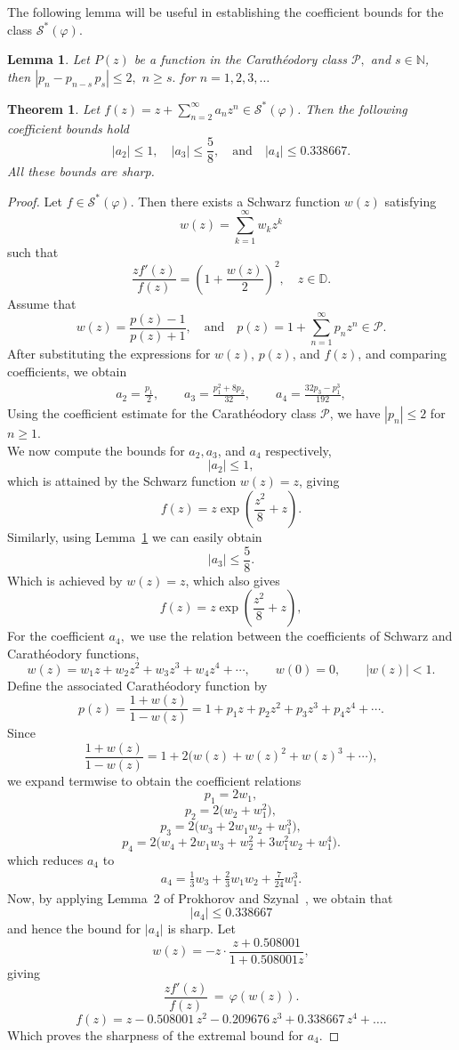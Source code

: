 \documentclass[a4paper,12pt,reqno]{amsart} %
\numberwithin{equation}{section}
\newtheorem{thm}{Theorem}[section]
\newtheorem{lem}{Lemma}[section]
\theoremstyle{definition}
\begin{document}
The following lemma will be useful in establishing the coefficient bounds for the class $\mathcal{S}^*(\varphi)$.
\begin{lem}\cite{LiberaZlotkiewicz1982}\label{lemma1}
Let $P(z)$ be a function in the Carathéodory class $\mathcal{P},$ and  $s \in \mathbb{N}$, then $|p_n -p_{n-s}\,  p_s|\leq 2,$ $n \geq s.$ for $n = 1, 2, 3, \ldots$
\end{lem}
\begin{thm}\label{Coefficients}
Let $f(z) = z + \sum_{n=2}^{\infty} a_n z^n \in \mathcal{S}^*(\varphi)$.
Then the following coefficient bounds hold
\[
|a_2| \leq 1, \quad |a_3| \leq \frac{5}{8}, \quad \text{and} \quad |a_4| \leq 0.338667.
\]
All these bounds are sharp.
\end{thm}
\begin{proof}
Let $f \in \mathcal{S}^*(\varphi)$. Then there exists a Schwarz function  $w(z)$ satisfying
\[
w(z) = \sum_{k=1}^{\infty} w_k z^k
\]
such that
\[
\frac{z f'(z)}{f(z)} = \left(1 + \frac{w(z)}{2} \right)^2, \quad z \in \mathbb{D}.
\]
Assume that
\[
w(z) = \frac{p(z) - 1}{p(z) + 1},\quad \mbox{and}  \quad p(z) = 1 + \sum_{n=1}^{\infty}p_{n}z^{n} \in \mathcal{P}.
\]
After substituting the expressions for $w(z)$, $p(z)$, and $f(z)$, and comparing coefficients, we obtain
\begin{align*}
a_2 = \frac{p_1}{2}, \qquad
a_3 = \frac{p_1^2 + 8p_2}{32}, \qquad
a_4 = \frac{32p_3 - p_1^3}{192},
\end{align*}
Using the coefficient estimate for the Carathéodory class $\mathcal{P}$, we have $|p_n| \leq 2$ for $n \geq 1$.\\[2mm]
We now compute the bounds for $a_2, a_{3}$, and $a_{4}$ respectively,
\[
|a_2| \leq 1,
\]
which is attained by the Schwarz function $w(z) = z$, giving
\[
f(z) = z \exp\left( \frac{z^2}{8} + z \right).
\]
Similarly, using Lemma~\ref{lemma1} we can easily obtain
\[
|a_3| \leq \frac{5}{8}.
\]
Which is achieved by $w(z) = z$, which also gives
\[
f(z) = z \exp\left( \frac{z^2}{8} + z \right),
\]
For the coefficient $a_{4},$ we use the relation between the coefficients of Schwarz and Carathéodory functions,
\[
w(z)=w_1 z+w_2 z^2+w_3 z^3+w_4 z^4+\cdots,\qquad w(0)=0,\qquad |w(z)|<1.
\]
Define the associated Carath\'eodory function by
\[
p(z)=\frac{1+w(z)}{1-w(z)}
=1+p_1 z+p_2 z^2+p_3 z^3+p_4 z^4+\cdots .
\]
Since
\[
\frac{1+w(z)}{1-w(z)}
=1+2\bigl(w(z)+w(z)^2+w(z)^3+\cdots\bigr),
\]
we expand termwise to obtain the coefficient relations
\[
p_1=2w_1,
\]
\[
p_2=2\bigl(w_2+w_1^2\bigr),
\]
\[
p_3=2\bigl(w_3+2w_1w_2+w_1^3\bigr),
\]
\[
p_4=2\bigl(w_4+2w_1w_3+w_2^2+3w_1^2w_2+w_1^4\bigr).
\]
which reduces $a_{4}$ to
\begin{align*}
a_{4}=\frac{1}{3}w_3+\frac{2}{3}w_1w_2+\frac{7}{24}w_1^{3}.
\end{align*}
Now, by applying Lemma~2 of Prokhorov and Szynal~\cite{ProkhorovSzynal1981}, we obtain that
\[
|a_{4}| \leq 0.338667
\]
and hence the bound for $|a_4|$ is sharp. Let
\[
w(z) = -z \cdot \frac{z+0.508001}{1+0.508001 z},
\]
giving
\[
\frac{z f'(z)}{f(z)} \,=\, \varphi(w(z)).
\]
\[
f(z)
= z
- 0.508001\,z^{2}
- 0.209676\,z^{3}
+ 0.338667\,z^{4}
+\ldots.
\]
Which proves the sharpness of the extremal bound for $a_{4}.$
\end{proof}
\end{document}
